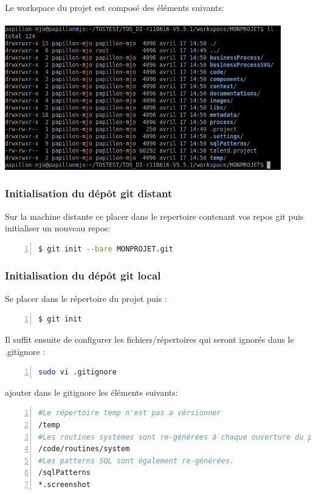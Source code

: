 \documentclass[10pt,oneside,a4paper]{book} %
\begin{document}
Le workspace du projet est composé des éléments suivants:\\\\
\includegraphics[origin=l,width=12cm]{image/image2.png}

\subsubsection{Initialisation du dépôt git distant}
Sur la machine distante ce placer dans le repertoire contenant vos repos git puis initialiser un nouveau repos:

\begin{lstlisting}[language=bash,numbers=left,numberstyle=\tiny,backgroundcolor=\color{Zgris}]		
$ git init --bare MONPROJET.git
\end{lstlisting}

\subsubsection{Initialisation du dépôt git local}

Se placer dans le répertoire du projet puis :

\begin{lstlisting}[language=bash,numbers=left,numberstyle=\tiny,backgroundcolor=\color{Zgris}]
$ git init
\end{lstlisting}

Il suffit ensuite de configurer les fichiers/répertoires qui seront ignorés dans le .gitignore :
\begin{lstlisting}[language=bash,numbers=left,numberstyle=\tiny,backgroundcolor=\color{Zgris}]
sudo vi .gitignore
\end{lstlisting}

ajouter dans le gitignore les éléments suivants:
\begin{lstlisting}[inputencoding=utf8,language=bash,numbers=left,numberstyle=\tiny,backgroundcolor=\color{Zgris},commentstyle=\color{CommentaireGris}]
#Le répertoire temp n'est pas a vérsionner
/temp
#Les routines systèmes sont re-générées à chaque ouverture du projet.
/code/routines/system
#Les patterns SQL sont également re-générées.
/sqlPatterns
*.screenshot
\end{lstlisting}
\end{document}
